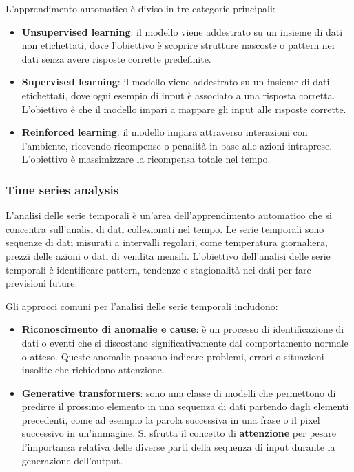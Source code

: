 \documentclass[a4paper]{article}
\begin{document}
L'apprendimento automatico è diviso in tre categorie principali:
\begin{itemize}
  \item \textbf{Unsupervised learning}: il modello viene addestrato su un insieme di dati non etichettati,
  dove l'obiettivo è scoprire strutture nascoste o pattern nei dati senza avere risposte corrette predefinite.
\item \textbf{Supervised learning}: il modello viene addestrato su un insieme di dati etichettati,
  dove ogni esempio di input è associato a una risposta corretta. L'obiettivo è che il modello impari a
  mappare gli input alle risposte corrette.
  \item \textbf{Reinforced learning}: il modello impara attraverso interazioni con l'ambiente, ricevendo
  ricompense o penalità in base alle azioni intraprese. L'obiettivo è massimizzare la ricompensa totale nel
  tempo.
\end{itemize}

\subsubsection{Time series analysis}
L'analisi delle serie temporali è un'area dell'apprendimento automatico che si concentra sull'analisi di dati
collezionati nel tempo. Le serie temporali sono sequenze di dati misurati a intervalli regolari, come
temperatura giornaliera, prezzi delle azioni o dati di vendita mensili. L'obiettivo dell'analisi delle
serie temporali è identificare pattern, tendenze e stagionalità nei dati per fare previsioni future.

\vspace{1em}
\noindent
Gli approcci comuni per l'analisi delle serie temporali includono:
\begin{itemize}
  \item \textbf{Riconoscimento di anomalie e cause}:
    è un processo di identificazione di dati o eventi che si discostano
    significativamente dal comportamento normale o atteso. Queste anomalie possono indicare problemi,
    errori o situazioni insolite che richiedono attenzione.

  \item \textbf{Generative transformers}:
    sono una classe di modelli che permettono di predirre il prossimo elemento in una
    sequenza di dati partendo dagli elementi precedenti, come ad esempio la parola successiva in una frase o il
    pixel successivo in un'immagine. Si sfrutta il concetto di \textbf{attenzione} per pesare l'importanza
    relativa delle diverse parti della sequenza di input durante la generazione dell'output.
\end{itemize}
\end{document}
